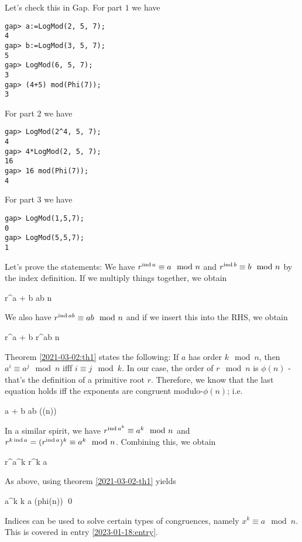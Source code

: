 Let's check this in Gap. For part $1$ we have

\begin{verbatim}
gap> a:=LogMod(2, 5, 7);
4
gap> b:=LogMod(3, 5, 7);
5
gap> LogMod(6, 5, 7);
3
gap> (4+5) mod(Phi(7));
3
\end{verbatim}

For part $2$ we have

\begin{verbatim}
gap> LogMod(2^4, 5, 7);
4
gap> 4*LogMod(2, 5, 7);
16
gap> 16 mod(Phi(7));
4
\end{verbatim}

For part 3 we have

\begin{verbatim}
gap> LogMod(1,5,7);
0
gap> LogMod(5,5,7);
1
\end{verbatim}

Let's prove the statements: We have $r^{\operatorname{ind} a} \equiv a \mod n$ and $r^{\operatorname{ind} b} \equiv b \mod n$ by the index definition. If we multiply things together, we obtain

\bee
r^{\ind a + \ind b} \equiv ab \mod n
\eee

We also have $r^{\operatorname{ind} ab} \equiv ab \mod n$ and if we insert this into the RHS, we obtain

\bee
r^{\ind a + \ind b} \equiv r^{\ind ab} \mod n
\eee


Theorem \ref{2021-03-02:th1} states the following: If $a$ has order $k \mod n$, then $a^i \equiv a^j \mod n$ ifff $i \equiv j \mod k$. In our case, the order of $r \mod n$ is $\phi(n)$ - that's the definition of a primitive root $r$. Therefore, we know that the last equation holds iff the exponents are congruent modulo-$\phi(n)$; i.e.

\bee
\ind a + \ind b \equiv \ind ab \mod(\phi(n))
\eee

In a similar spirit, we have $r^{\operatorname{ind} a^k} \equiv a^k \mod n$ and $r^{k \operatorname{ind} a} = (r^{\operatorname{ind} a})^k \equiv a^k \mod n$. Combining this, we obtain

\bee
r^{\ind a^k} \equiv r^{k \ind a}
\eee

As above, using theorem \ref{2021-03-02-th1} yields

\bee
\ind a^k \equiv k \ind a \mod(phi(n)) \qed
\eee

Indices can be used to solve certain types of congruences, namely $x^k \equiv a \mod n$. This is covered in entry \ref{2023-01-18:entry}.

